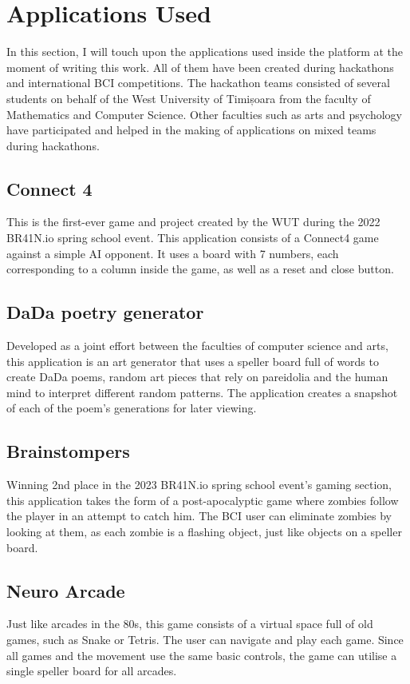 \newpage

\section{Applications Used} \label{sect:Applications Used}
In this section, I will touch upon the applications used inside the platform at the moment of writing this work. All of them have been created during hackathons and international BCI competitions. The hackathon teams consisted of several students on behalf of the West University of Timișoara from the faculty of Mathematics and Computer Science. Other faculties such as arts and psychology have participated and helped in the making of applications on mixed teams during hackathons.

\subsection{Connect 4}
This is the first-ever game and project created by the WUT during the 2022 BR41N.io spring school event. This application consists of a Connect4 game against a simple AI opponent. It uses a board with 7 numbers, each corresponding to a column inside the game, as well as a reset and close button. 

\subsection{DaDa poetry generator}
Developed as a joint effort between the faculties of computer science and arts, this application is an art generator that uses a speller board full of words to create DaDa poems, random art pieces that rely on pareidolia and the human mind to interpret different random patterns. The application creates a snapshot of each of the poem's generations for later viewing.

\subsection{Brainstompers}
Winning 2nd place in the 2023 BR41N.io spring school event's gaming section\cite{spring-school_2023}, this application takes the form of a post-apocalyptic game where zombies follow the player in an attempt to catch him. The BCI user can eliminate zombies by looking at them, as each zombie is a flashing object, just like objects on a speller board.

\subsection{Neuro Arcade}
Just like arcades in the 80s, this game consists of a virtual space full of old games, such as Snake or Tetris. The user can navigate and play each game. Since all games and the movement use the same basic controls, the game can utilise a single speller board for all arcades.


